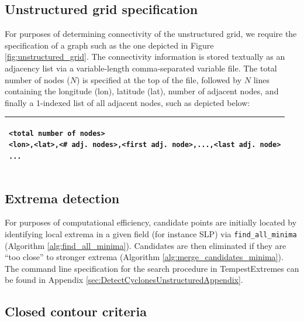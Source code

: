 \documentclass[gmdd, hvmath, online]{copernicus_discussions}
\begin{document}
\subsection{Unstructured grid specification}

For purposes of determining connectivity of the unstructured grid, we require the specification of a graph such as the one depicted in Figure \ref{fig:unstructured_grid}.  The connectivity information is stored textually as an adjacency list via a variable-length comma-separated variable file.  The total number of nodes ($N$) is specified at the top of the file, followed by $N$ lines containing the longitude (lon), latitude (lat), number of adjacent nodes, and finally a 1-indexed list of all adjacent nodes, such as depicted below:
\ \\

\noindent \begin{tabular}{|p{\textwidth}|}
\hline \small \begin{verbatim}
<total number of nodes>
<lon>,<lat>,<# adj. nodes>,<first adj. node>,...,<last adj. node>
...
\end{verbatim} \\
\hline
\end{tabular}

\subsection{Extrema detection}

For purposes of computational efficiency, candidate points are initially located by identifying local extrema in a given field (for instance SLP) via \texttt{find\_all\_minima} (Algorithm \ref{alg:find_all_minima}).  Candidates are then eliminated if they are ``too close'' to stronger extrema (Algorithm \ref{alg:merge_candidates_minima}).  The command line specification for the search procedure in TempestExtremes can be found in Appendix \ref{sec:DetectCyclonesUnstructuredAppendix}.


\subsection{Closed contour criteria} \label{sec:ClosedContour}
\end{document}
